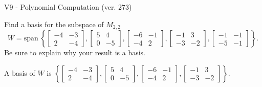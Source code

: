 \begin{exercise}
  \begin{exerciseTitle}V9 - Polynomial Computation (ver. 273)\end{exerciseTitle}
  \begin{exerciseStatement}
    Find a basis for the subspace of \(M_{2,2}\) 
\[W=\mathrm{span}\ \left\{\left[\begin{array}{cc}
-4 & -3 \\
2 & -4
\end{array}\right] , \left[\begin{array}{cc}
5 & 4 \\
0 & -5
\end{array}\right] , \left[\begin{array}{cc}
-6 & -1 \\
-4 & 2
\end{array}\right] , \left[\begin{array}{cc}
-1 & 3 \\
-3 & -2
\end{array}\right] , \left[\begin{array}{cc}
-1 & -1 \\
-5 & -1
\end{array}\right]\right\}.\]
 Be sure to explain why your result is a basis.


  \end{exerciseStatement}
  \begin{exerciseAnswer}
   A basis of \(W\) is  \(\left\{\left[\begin{array}{cc}
-4 & -3 \\
2 & -4
\end{array}\right] , \left[\begin{array}{cc}
5 & 4 \\
0 & -5
\end{array}\right] , \left[\begin{array}{cc}
-6 & -1 \\
-4 & 2
\end{array}\right] , \left[\begin{array}{cc}
-1 & 3 \\
-3 & -2
\end{array}\right]\right\}\).
  


  \end{exerciseAnswer}
\end{exercise}